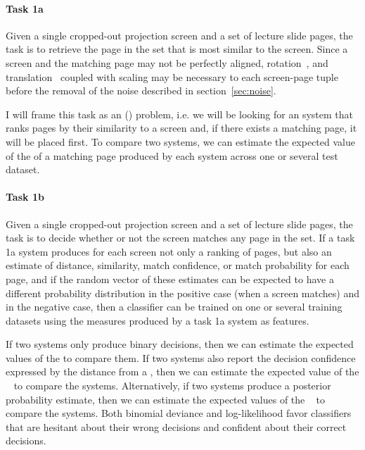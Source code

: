 \paragraph{Task 1a} Given a single cropped-out projection screen and a set of
lecture slide pages, the task is to retrieve the page in the set that is most
similar to the screen. Since a screen and the matching page may not be
perfectly aligned, rotation~\cite{smith1995simple}, and
translation~\cite{sarvaiyaetal09} coupled with scaling may be necessary to
 each screen-page tuple before the removal of the noise
described in section~\ref{sec:noise}.

I will frame this task as an  () problem,
i.e. we will be looking for an  system that ranks pages by their
similarity to a screen and, if there exists a matching page, it will be placed
first. To compare two systems, we can estimate the expected value of the
 of a matching page produced by each system across one or several
test dataset.

\paragraph{Task 1b} Given a single cropped-out projection screen and a set of
lecture slide pages, the task is to decide whether or not the screen matches
any page in the set.  If a task 1a system produces for each screen not only a
ranking of pages, but also an estimate of distance, similarity, match
confidence, or match probability for each page, and if the random vector of
these estimates can be expected to have a different probability distribution
in the positive case (when a screen matches) and in the negative case, then a
classifier can be trained on one or several training datasets using the
measures produced by a task 1a system as features.

If two systems only produce binary decisions, then we can estimate the expected
values of the  to compare them. If two systems
also report the decision confidence expressed by the distance from a
, then we can estimate the expected value of the
~\cite[sec.~10.6]{friedman2001elements} to compare the
systems. Alternatively, if two systems produce a posterior probability
estimate, then we can estimate the expected values of the
~\cite[sec.~2.6.3]{friedman2001elements} to compare the
systems.
Both binomial deviance and log-likelihood favor classifiers that are hesitant
about their wrong decisions and confident about their correct decisions.

